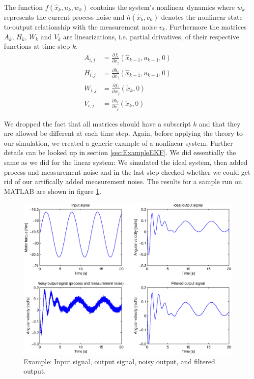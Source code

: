 The function \(f(\hat{x}_k,u_k,w_k)\) contains the system's nonlinear dynamics where \(w_k\) represents the current process noise and \(h(\hat{x}_k, v_k)\) denotes the nonlinear state-to-output relationship with the measurement noise \(v_k\). Furthermore the matrices \(A_k\), \(H_k\), \(W_k\) and \(V_k\) are linearizations, i.e. partial drivatives, of their respective functions at time step \(k\).
\newline
	\begin{eqnarray}\label{Linearizations}
    			A_{i,j}&= \frac{\partial f_i}{\partial x_j}(\hat{x}_{k-1},u_{k-1},0) \\
    			H_{i,j}&= \frac{\partial h_i}{\partial x_j}(\hat{x}_{k-1},u_{k-1},0) \\
			W_{i,j}&= \frac{\partial f_i}{\partial w_j}(\tilde{x}_k,0) \\
			V_{i,j}&= \frac{\partial h_i}{\partial v_j}(\tilde{x}_k,0)
	\end{eqnarray}

We dropped the fact that all matrices should have a subscript \(k\) and that they are allowed be different at each time step. Again, before applying the theory to our simulation, we created a generic example of a nonlinear system. Further details can be looked up in section \ref{sec:ExampleEKF}. We did essentially the same as we did for the linear system: We simulated the ideal system, then added process and measurement noise and in the last step checked whether we could get rid of our artifically added measurement noise. The results for a sample run on MATLAB are shown in figure \ref{fig:EKFchart}.

\begin{figure}[htbp]
	\centering
    	\includegraphics[width=12cm]{./3_KalmanFilterTheory/EKFchart.eps}
  	\caption{Example: Input signal, output signal, noisy output, and filtered output.}
  	\label{fig:EKFchart}
\end{figure}

